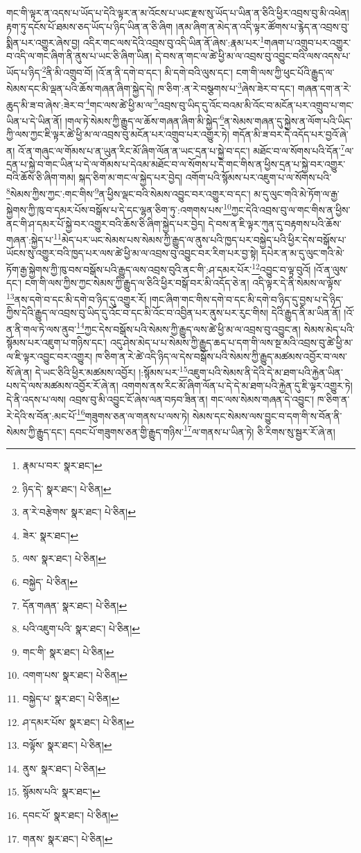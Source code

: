 གང་གི་ལྟར་ན་འདས་པ་ཡོད་པ་དེའི་ལྟར་ན་མ་འོངས་པ་ཡང་རྫས་སུ་ཡོད་པ་ཡིན་ན་ཅིའི་ཕྱིར་འབྲས་བུ་མི་འཕེན། རྟག་ཏུ་དངོས་པོ་ཐམས་ཅད་ཡོད་པ་ཉིད་ཡིན་ན་ཅི་ཞིག །ནམ་ཞིག་ན་མེད་ན་འདི་ལྟར་ཚོགས་པ་རྙེད་ན་འབྲས་བུ་སྨིན་པར་འགྱུར་ཞེས་བྱ། འདིར་གང་ལས་དེའི་འབྲས་བུ་འདི་ཡིན་ནོ་ཞེས་:རྣམ་པར་\footnote{རྣམ་པ་བར་  སྣར་ཐང་། }གཞག་པ་འགྲུབ་པར་འགྱུར་བ་འདི་ལ་གང་ཞིག་ནི་ནུས་པ་ཡང་ཅི་ཞིག་ཡིན། དེ་བས་ན་གང་ལ་ཚེ་ཕྱི་མ་ལ་འབྲས་བུ་འབྱུང་བའི་ལས་འདས་པ་ཡོད་པ་ཉིད་\footnote{ཉིད་དེ་  སྣར་ཐང་།  པེ་ཅིན། }ནི་མི་འགྲུབ་བོ། །འོ་ན་ནི་དགེ་བ་དང་། མི་དགེ་བའི་ལུས་དང་། ངག་གི་ལས་ཀྱི་ཕུང་པོའི་རྒྱུད་ལ་སེམས་དང་མི་ལྡན་པའི་ཆོས་གཞན་ཞིག་སྐྱེད་དེ། ཁ་ཅིག་:ན་རེ་བསྩགས་པ་\footnote{ན་རེ་བརྩེགས་  སྣར་ཐང་།  པེ་ཅིན། }ཞེས་ཟེར་བ་དང་། གཞན་དག་ན་རེ་ཆུད་མི་ཟ་བ་ཞེས་:ཟེར་བ་\footnote{ཟེར་  སྣར་ཐང་། }གང་ལས་ཚེ་ཕྱི་མ་ལ་\footnote{ལས་  སྣར་ཐང་།  པེ་ཅིན། }འབྲས་བུ་ཡིད་དུ་འོང་བའམ་མི་འོང་བ་མངོན་པར་འགྲུབ་པ་གང་ཡིན་པ་དེ་ཡིན་ནོ། །གལ་ཏེ་སེམས་ཀྱི་རྒྱུད་ལ་ཆོས་གཞན་ཞིག་མི་སྐྱེད་\footnote{བསྐྱེད་  པེ་ཅིན། }ན་སེམས་གཞན་དུ་སྐྱེས་ན་ལོག་པའི་ཡིད་ཀྱི་ལས་ཀྱང་ཇི་ལྟར་ཚེ་ཕྱི་མ་ལ་འབྲས་བུ་མངོན་པར་འགྲུབ་པར་འགྱུར་ཏེ། གདོན་མི་ཟ་བར་དེ་འདོད་པར་བྱའོ་ཞེ་ན། འོ་ན་གཞུང་ལ་གོམས་པ་ན་ཡུན་རིང་མོ་ཞིག་ལོན་ན་ཡང་དྲན་པ་སྐྱེ་བ་དང་། མཐོང་བ་ལ་སོགས་པའི་དོན་\footnote{དོན་གཞན་  སྣར་ཐང་།  པེ་ཅིན། }ལ་དྲན་པ་སྐྱེ་བ་གང་ཡིན་པ་དེ་ལ་གོམས་པ་དེའམ་མཐོང་བ་ལ་སོགས་པ་དེ་གང་གིས་ན་ཕྱིས་དྲན་པ་སྐྱེ་བར་འགྱུར་བའི་ཆོས་ཅི་ཞིག་གམ། སྐད་ཅིག་མ་གང་ལ་སྐྱེད་པར་བྱེད། འགོག་པའི་སྙོམས་པར་འཇུག་པ་ལ་སོགས་པའི་\footnote{པའི་འཇུག་པའི་  སྣར་ཐང་།  པེ་ཅིན། }སེམས་ཀྱིས་ཀྱང་:གང་གིས་\footnote{གང་གི་  སྣར་ཐང་།  པེ་ཅིན། }ན་ཕྱིས་ལྡང་བའི་སེམས་འབྱུང་བར་འགྱུར་བ་དང་། མ་དུ་ལུང་གའི་མེ་ཏོག་ལ་རྒྱ་སྐྱེགས་ཀྱི་ཁུ་བ་དམར་པོས་བསྒོས་པ་དེ་དང་ལྷན་ཅིག་ཏུ་:འགགས་པས་\footnote{འགག་པས་  སྣར་ཐང་།  པེ་ཅིན། }ཀྱང་དེའི་འབྲས་བུ་ལ་གང་གིས་ན་ཕྱིས་ནང་གི་ཤ་དམར་པོ་སྐྱེ་བར་འགྱུར་བའི་ཆོས་ཅི་ཞིག་སྐྱེད་པར་བྱེད། དེ་བས་ན་ཇི་ལྟར་ཀུན་དུ་བརྟགས་པའི་ཆོས་གཞན་:སྐྱེད་པ་\footnote{བསྐྱེད་པ་  སྣར་ཐང་།  པེ་ཅིན། }མེད་པར་ཡང་སེམས་པས་སེམས་ཀྱི་རྒྱུད་ལ་ནུས་པའི་ཁྱད་པར་བསྐྱེད་པའི་ཕྱིར་དེས་བསྒོས་པ་ཡོངས་སུ་འགྱུར་བའི་ཁྱད་པར་ལས་ཚེ་ཕྱི་མ་ལ་འབྲས་བུ་འབྱུང་བར་རིག་པར་བྱ་སྟེ། དཔེར་ན་མ་དུ་ལུང་གའི་མེ་ཏོག་རྒྱ་སྐྱེགས་ཀྱི་ཁུ་བས་བསྒོས་པའི་རྒྱུད་ལས་འབྲས་བུའི་ནང་གི་:ཤ་དམར་པོར་\footnote{ཤ་དམར་པོས་  སྣར་ཐང་།  པེ་ཅིན། }འབྱུང་བ་ལྟ་བུའོ། །འོ་ན་ལུས་དང་། ངག་གི་ལས་ཀྱིས་ཀྱང་སེམས་ཀྱི་རྒྱུད་ལ་ཅིའི་ཕྱིར་བསྒོ་བར་མི་འདོད་ཅེ་ན། འདི་ལྟར་དེ་ནི་སེམས་ལ་ལྟོས་\footnote{བལྟོས་  སྣར་ཐང་།  པེ་ཅིན། }ནས་དགེ་བ་དང་མི་དགེ་བ་ཉིད་དུ་འགྱུར་རོ། །གང་ཞིག་གང་གིས་དགེ་བ་དང་མི་དགེ་བ་ཉིད་དུ་བྱས་པ་དེ་ཉིད་ཀྱིས་དེའི་རྒྱུད་ལ་འབྲས་བུ་ཡིད་དུ་འོང་བ་དང་མི་འོང་བ་འབྱིན་པར་ནུས་པར་རུང་གིས། དེའི་རྒྱུད་ནི་མ་ཡིན་ནོ། །འོ་ན་ནི་གལ་ཏེ་ལས་ནུབ་\footnote{ནུས་  སྣར་ཐང་།  པེ་ཅིན། }ཀྱང་དེས་བསྒོས་པའི་སེམས་ཀྱི་རྒྱུད་ལས་ཚེ་ཕྱི་མ་ལ་འབྲས་བུ་འབྱུང་ན། སེམས་མེད་པའི་སྙོམས་པར་འཇུག་པ་གཉིས་དང་། འདུ་ཤེས་མེད་པ་པ་སེམས་ཀྱི་རྒྱུད་ཆད་པ་དག་གི་ལས་སྔ་མའི་འབྲས་བུ་ཚེ་ཕྱི་མ་ལ་ཇི་ལྟར་འབྱུང་བར་འགྱུར། ཁ་ཅིག་ན་རེ་ཚེ་འདི་ཉིད་ལ་དེས་བསྒོས་པའི་སེམས་ཀྱི་རྒྱུད་མཚམས་འབྱོར་བ་ལས་སོ་ཞེ་ན། དེ་ཡང་ཅིའི་ཕྱིར་མཚམས་འབྱོར། །:སྙོམས་པར་\footnote{སྙོམས་པའི་  སྣར་ཐང་། }འཇུག་པའི་སེམས་ནི་དེའི་དེ་མ་ཐག་པའི་རྐྱེན་ཡིན་པས་དེ་ལས་མཚམས་འབྱོར་རོ་ཞེ་ན། འགགས་ནས་རིང་མོ་ཞིག་ལོན་པ་དེ་དེ་མ་ཐག་པའི་རྐྱེན་དུ་ཇི་ལྟར་འགྱུར་ཏེ། དེ་ནི་འདས་པ་ལས། འབྲས་བུ་མི་འབྱུང་ངོ་ཞེས་ལན་བཏབ་ཟིན་ན། གང་ལས་སེམས་གཞན་དེ་འབྱུང་། ཁ་ཅིག་ན་རེ་དེའི་ས་བོན་:མང་པོ་\footnote{དབང་པོ་  སྣར་ཐང་།  པེ་ཅིན། }གཟུགས་ཅན་ལ་གནས་པ་ལས་ཏེ། སེམས་དང་སེམས་ལས་བྱུང་བ་དག་གི་ས་བོན་ནི་སེམས་ཀྱི་རྒྱུད་དང་། དབང་པོ་གཟུགས་ཅན་གྱི་རྒྱུད་གཉིས་\footnote{གནས་  སྣར་ཐང་།  པེ་ཅིན། }ལ་གནས་པ་ཡིན་ཏེ། ཅི་རིགས་སུ་སྦྱར་རོ་ཞེ་ན། 